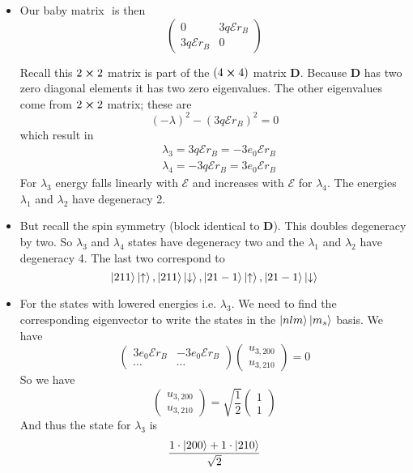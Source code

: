 \documentclass[11pt, a4paper]{article}
\newcommand{\mat}[1]{\mathbf{#1}} %
\newcommand{\E}{\mathcal{E}}  %
\newcommand{\ua}{\uparrow}  %
\newcommand{\da}{\downarrow}  %
\begin{document}
\begin{itemize}
	\item Our baby matrix $  $ is then
	\begin{equation*}
		\begin{pmatrix}
		0 & 3q\E r_{B} \\
		3q\E r_{B} & 0
		\end{pmatrix}
	\end{equation*}
	
	Recall this $ 2 \cross 2 $ matrix is part of the $ (4 \cross 4) $ matrix $ \mat{D} $. Because $ \mat{D}  $ has two zero diagonal elements it has two zero eigenvalues. The other eigenvalues come from $ 2 \cross 2 $ matrix; these are
	\begin{equation*}
		(- \lambda)^{2} - (3 q \E r_{B})^{2} = 0
	\end{equation*}
	which result in
	\begin{align*}
		&\lambda_{3} = 3q\E r_{B} = -3e_{0}\E r_{B}\\
		&\lambda_{4} = -3q\E r_{B} = 3e_{0}\E r_{B}
	\end{align*}
	For $ \lambda_{3} $ energy falls linearly with $ \E $ and increases with $ \E $ for $ \lambda_{4} $. The energies $ \lambda_{1} $ and $ \lambda_{2} $ have degeneracy 2.
	
	\item But recall the spin symmetry (block identical to $ \mat{D} $). This doubles degeneracy by two. So $ \lambda_{3} $ and $ \lambda_{4} $ states have degeneracy two and the $ \lambda_{1} $ and $ \lambda_{2} $ have degeneracy 4. The last two correspond to
	\begin{equation*}
		\ket{211}\ket{\ua}, \ket{211}\ket{\da}, \ket{21-1}\ket{\ua}, \ket{21-1}\ket{\da}
	\end{equation*}
	
	\item For the states with lowered energies i.e. $ \lambda_{3} $. We need to find the corresponding eigenvector to write the states in the $ \ket{nlm}\ket{m_{s}} $ basis. We have
	\begin{equation*}
		\begin{pmatrix}
		3e_{0}\E r_{B} & -3e_{0}\E r_{B} \\
		\cdots  & \cdots
		\end{pmatrix}
		\begin{pmatrix}
			u_{3, 200}\\
			u_{3, 210}
		\end{pmatrix}
		 = 0
	\end{equation*}
	So we have
	\begin{equation*}
		\begin{pmatrix}
			u_{3, 200}\\
			u_{3, 210}
		\end{pmatrix} 
		 = \sqrt{\frac{1}{2}}
		 \begin{pmatrix}
		 1\\
		 1
		 \end{pmatrix}
	\end{equation*}
	And thus the state for $ \lambda_{3} $ is
	\begin{equation*}
		\frac{1\cdot \ket{200} + 1\cdot \ket{210}}{\sqrt{2}}
	\end{equation*}
	

\end{itemize}
\end{document}
